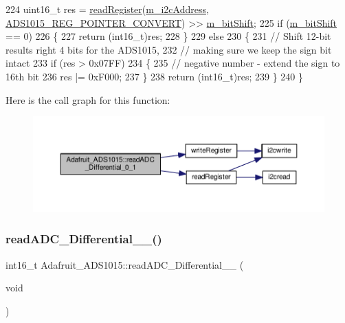 \begin{DoxyCode}
224   uint16\_t res = \hyperlink{_cool_adafruit___a_d_s1015_8cpp_a319539381b7551b2f83a92b0b596e97d}{readRegister}(\hyperlink{class_adafruit___a_d_s1015_a2186993621a7973256d47f086c74035d}{m\_i2cAddress}, 
      \hyperlink{_cool_adafruit___a_d_s1015_8h_a0f462c806b353bd682fa3c2d67e66622}{ADS1015\_REG\_POINTER\_CONVERT}) >> \hyperlink{class_adafruit___a_d_s1015_ab238ce17112a78db2be4ea14d57fb114}{m\_bitShift};
225   \textcolor{keywordflow}{if} (\hyperlink{class_adafruit___a_d_s1015_ab238ce17112a78db2be4ea14d57fb114}{m\_bitShift} == 0)
226   \{
227     \textcolor{keywordflow}{return} (int16\_t)res;
228   \}
229   \textcolor{keywordflow}{else}
230   \{
231     \textcolor{comment}{// Shift 12-bit results right 4 bits for the ADS1015,}
232     \textcolor{comment}{// making sure we keep the sign bit intact}
233     \textcolor{keywordflow}{if} (res > 0x07FF)
234     \{
235       \textcolor{comment}{// negative number - extend the sign to 16th bit}
236       res |= 0xF000;
237     \}
238     \textcolor{keywordflow}{return} (int16\_t)res;
239   \}
240 \}
\end{DoxyCode}
Here is the call graph for this function\+:\nopagebreak
\begin{figure}[H]
\begin{center}
\leavevmode
\includegraphics[width=350pt]{df/df6/class_adafruit___a_d_s1015_a56582333958e66efaccd3d4a8a47e3ff_cgraph}
\end{center}
\end{figure}
\mbox{\label{class_adafruit___a_d_s1015_a38311881bcab46f7496c4bb6e4cad576}} 
\subsubsection{\texorpdfstring{read\+A\+D\+C\+\_\+\+Differential\+\_\+\_()}{readADC\_Differential\_2\_3()}}
{\footnotesize\ttfamily int16\+\_\+t Adafruit\+\_\+\+A\+D\+S1015\+::read\+A\+D\+C\+\_\+\+Differential\+\_\+\_ (\begin{DoxyParamCaption}\item[{void}]{ }\end{DoxyParamCaption})}



